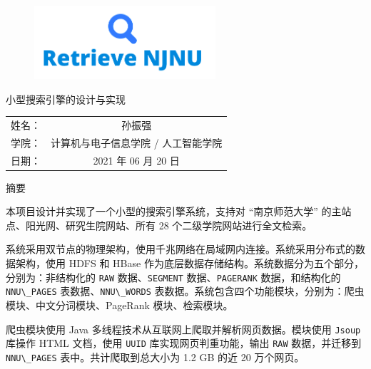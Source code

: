 \documentclass{ctexart}
\newcommand{\code}[1]{\colorbox{backcolor}{\lstinline|#1|}}
\begin{document}
    \thispagestyle{firstpage}

    \begin{center}

        \vspace*{3cm}

        \begin{figure}[h]
            \centering
            \includegraphics[width=0.6\textwidth]{src/system-logo}
        \end{figure}

        \vspace*{1cm}

        {\Huge 小型搜索引擎的设计与实现}

        \vfill

        \begin{tabular}{cc}
            姓名： & 孙振强                 \\
            学院： & 计算机与电子信息学院 / 人工智能学院 \\
            日期： & 2021 年 06 月 20 日    \\
        \end{tabular}

    \end{center}

    \newpage

    \thispagestyle{abstract-cn}

    \begin{center}
        \LARGE 摘要
    \end{center}

    本项目设计并实现了一个小型的搜索引擎系统，支持对 “南京师范大学” 的主站点、阳光网、研究生院网站、所有 28 个二级学院网站进行全文检索。

    系统采用双节点的物理架构，使用千兆网络在局域网内连接。系统采用分布式的数据架构，使用 HDFS 和 HBase 作为底层数据存储结构。系统数据分为五个部分，分别为：非结构化的 \code{RAW} 数据、\code{SEGMENT} 数据、\code{PAGERANK} 数据，和结构化的 \code{NNU\_PAGES} 表数据、\code{NNU\_WORDS} 表数据。系统包含四个功能模块，分别为：爬虫模块、中文分词模块、PageRank 模块、检索模块。

    爬虫模块使用 Java 多线程技术从互联网上爬取并解析网页数据。模块使用 \code{Jsoup} 库操作 HTML 文档，使用 \code{UUID} 库实现网页判重功能，输出 \code{RAW} 数据，并迁移到 \code{NNU\_PAGES} 表中。共计爬取到总大小为 1.2 GB 的近 20 万个网页。
\end{document}
